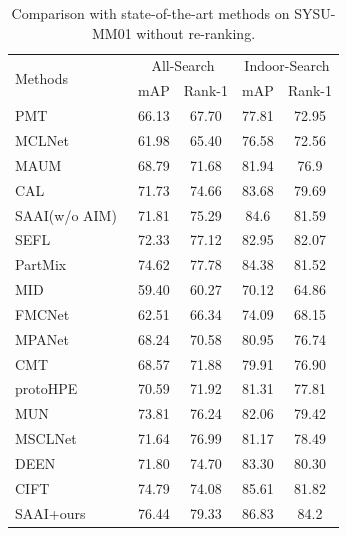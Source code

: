 \begin{table}
\small
\centering
\renewcommand\tabcolsep{5pt}
	\begin{tabular}{l|cc|cc}
		\hline
		\multirow{2}{*}{Methods} & \multicolumn{2}{c|}{All-Search} &\multicolumn{2}{c}{Indoor-Search}\\ \cline{2-5}
              & mAP & Rank-1 & mAP & Rank-1 \\ \cline{1-5}
             PMT\cite{lu2023learning}& 66.13& 67.70& 77.81& 72.95\\
             MCLNet~\cite{hao2021cross}& 61.98 &65.40&76.58 &72.56\\
             MAUM~\cite{Liu2022LearningMU}& 68.79 &71.68& 81.94 &76.9\\
             CAL\cite{CAL}& 71.73 &74.66& 83.68 &79.69\\
             SAAI(w/o AIM)~\cite{fang2023visible}&  71.81& 75.29&  84.6 &81.59\\
             SEFL\cite{feng2023shape}& 72.33 &77.12& 82.95 &82.07\\
             PartMix\cite{kim2023partmix}& 74.62 &77.78& 84.38 &81.52\\
             MID~\cite{Huang2022ModalityAdaptiveMA} & 59.40 &60.27& 70.12 &64.86\\
             FMCNet~\cite{zhang2022fmcnet}& 62.51 &66.34& 74.09 &68.15\\
             MPANet~\cite{wu2021discover}& 68.24 &70.58& 80.95 &76.74\\
             CMT~\cite{jiang2022cross}& 68.57 &71.88& 79.91 &76.90\\
             protoHPE~\cite{zhang2023protohpe}& 70.59 &71.92&81.31 &77.81\\
             MUN~\cite{yu2023modality}& 73.81 &76.24& 82.06 &79.42\\
             MSCLNet~\cite{zhang2022modality}& 71.64 &76.99& 81.17 &78.49\\
             DEEN~\cite{zhang2023diverse}& 71.80 &74.70& 83.30 &80.30\\
             CIFT~\cite{li2022counterfactual}& 74.79 &74.08& 85.61 &81.82\\
             \cline{1-5}
             \rowcolor{gray!20}
            SAAI+ours&76.44&79.33& 86.83& 84.2\\
             \cline{1-5}
	\end{tabular}
             \caption{Comparison with state-of-the-art methods on SYSU-MM01 without re-ranking.}
             \label{tab:sys}                               
\end{table}


